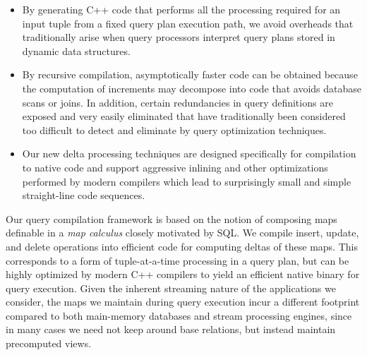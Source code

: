 \begin{itemize}
\vspace{-2mm}
\item By generating C++ code that performs all the processing required for an
input tuple from a fixed query plan execution path, we avoid overheads that
traditionally arise when query processors interpret query plans stored in
dynamic data structures.
\vspace{-2mm}
\item By recursive compilation, asymptotically faster code can be obtained
because the computation of increments may decompose into code that avoids
database scans or joins.
%
In addition, certain redundancies in query definitions are exposed and very
easily eliminated that have traditionally been considered too difficult to
detect and eliminate by query optimization techniques.
\vspace{-2mm}
\item Our new delta processing techniques are designed specifically for
compilation to native code and support aggressive inlining and other
optimizations performed by modern compilers which lead to surprisingly small and
simple straight-line code sequences.
\end{itemize}



Our query compilation framework is based on the notion of composing maps
definable in a {\em map calculus}\/ closely motivated by SQL.  We compile insert,
update, and delete operations into efficient code for computing deltas of these
maps. This corresponds to a form of tuple-at-a-time processing in a query plan,
but can be highly optimized by modern C++ compilers to yield an efficient native
binary for query execution.  Given the inherent streaming nature of the
applications we consider, the maps we maintain during query execution incur a
different footprint compared to both main-memory databases and stream processing
engines, since in many cases we need not keep around base relations, but instead
maintain precomputed views.



